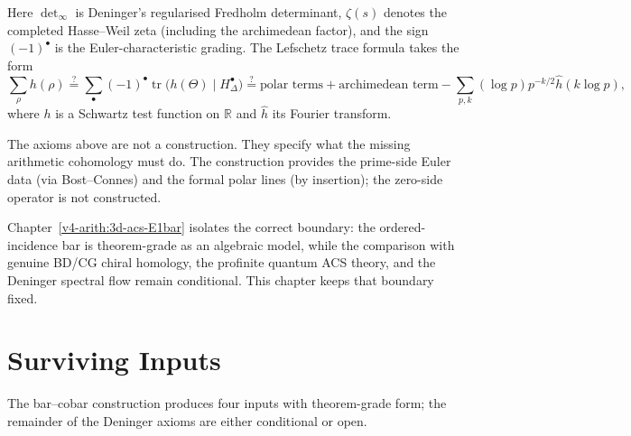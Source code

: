 Here \(\det_\infty\) is Deninger's regularised Fredholm determinant,
\(\zeta(s)\) denotes the completed Hasse--Weil zeta (including the
archimedean factor), and the sign \((-1)^\bullet\) is the
Euler-characteristic grading. The
Lefschetz trace formula takes the form
\begin{equation}
\label{v4-arith:w8-a:eq:deninger-lefschetz}
\sum_\rho h(\rho)
\stackrel{?}{=}
\sum_\bullet(-1)^\bullet
\operatorname{tr}\bigl(h(\Theta)\mid H^\bullet_\Delta\bigr)
\stackrel{?}{=}
\text{polar terms}+\text{archimedean term}
-\sum_{p,k}(\log p)p^{-k/2}\widehat{h}(k\log p),
\end{equation}
where \(h\) is a Schwartz test function on \(\mathbb{R}\) and
\(\widehat{h}\) its Fourier transform.

\begin{remark}
\label{v4-arith:w8-a:deninger-wishlist:rem:absence}
The axioms above are not a construction. They specify what the missing
arithmetic cohomology must do. The construction provides the prime-side
Euler data (via Bost--Connes) and the formal polar lines (by
insertion); the zero-side operator is not constructed.
\end{remark}

\begin{remark}
\label{v4-arith:w8-a:deninger-wishlist:rem:vol4}
Chapter~\ref{v4-arith:3d-acs-E1bar} isolates the correct boundary:
the ordered-incidence bar is theorem-grade as an algebraic model, while
the comparison with genuine BD/CG chiral homology, the profinite
quantum ACS theory, and the Deninger spectral flow remain conditional.
This chapter keeps that boundary fixed.
\end{remark}

\section{Surviving Inputs}
\label{v4-arith:w8-a:machinery}
\label{v4-arith:w8-a:machinery:ch23}

The bar--cobar construction produces four inputs with theorem-grade form;
the remainder of the Deninger axioms are either conditional or open.

